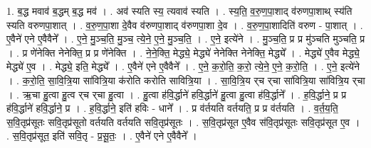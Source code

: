 \documentclass[17pt]{extarticle}
\begin{document}
1. ब॒द्ध मवाव॑ ब॒द्धम् ब॒द्ध मव॑ । . अव॑ स्यति स्य॒ त्यवाव॑ स्यति । . स्य॒ति॒ व॒रु॒ण॒पा॒शाद् व॑रुणपा॒शाथ् स्य॑ति स्यति वरुणपा॒शात् । . व॒रु॒ण॒पा॒शा दे॒वैव व॑रुणपा॒शाद् व॑रुणपा॒शा दे॒व । . व॒रु॒ण॒पा॒शादिति॑ वरुण - पा॒शात् । . ए॒वैने॑ एने ए॒वैवैने᳚ । . ए॒ने॒ मु॒ञ्च॒ति॒ मु॒ञ्च॒ त्ये॒ने॒ ए॒ने॒ मु॒ञ्च॒ति॒ । . ए॒ने॒ इत्ये॑ने । . मु॒ञ्च॒ति॒ प्र प्र मु॑ञ्चति मुञ्चति॒ प्र । . प्र णे॑नेक्ति नेनेक्ति॒ प्र प्र णे॑नेक्ति । . ने॒ने॒क्ति॒ मेद्ध्ये॒ मेद्ध्ये॑ नेनेक्ति नेनेक्ति॒ मेद्ध्ये᳚ । . मेद्ध्ये॑ ए॒वैव मेद्ध्ये॒ मेद्ध्ये॑ ए॒व । . मेद्ध्ये॒ इति॒ मेद्ध्ये᳚ । . ए॒वैने॑ एने ए॒वैवैने᳚ । . ए॒ने॒ क॒रो॒ति॒ क॒रो॒ त्ये॒ने॒ ए॒ने॒ क॒रो॒ति॒ । . ए॒ने॒ इत्ये॑ने । . क॒रो॒ति॒ सा॒वि॒त्रि॒या सा॑वित्रि॒या क॑रोति करोति सावित्रि॒या । . सा॒वि॒त्रि॒य र्‌च र्‌चा सा॑वित्रि॒या सा॑वित्रि॒य र्‌चा । . ऋ॒चा हु॒त्वा हु॒त्व र्‌च र्‌चा हु॒त्वा । . हु॒त्वा ह॑वि॒र्द्धाने॑ हवि॒र्द्धाने॑ हु॒त्वा हु॒त्वा ह॑वि॒र्द्धाने᳚ । . ह॒वि॒र्द्धाने॒ प्र प्र ह॑वि॒र्द्धाने॑ हवि॒र्द्धाने॒ प्र । . ह॒वि॒र्द्धाने॒ इति॑ हविः - धाने᳚ । . प्र व॑र्तयति वर्तयति॒ प्र प्र व॑र्तयति । . व॒र्त॒य॒ति॒ स॒वि॒तृप्र॑सूतः सवि॒तृप्र॑सूतो वर्तयति वर्तयति सवि॒तृप्र॑सूतः । . स॒वि॒तृप्र॑सूत ए॒वैव स॑वि॒तृप्र॑सूतः सवि॒तृप्र॑सूत ए॒व । . स॒वि॒तृप्र॑सूत॒ इति॑ सवि॒तृ - प्र॒सू॒तः॒ । . ए॒वैने॑ एने ए॒वैवैने᳚ । \newline
\end{document}
